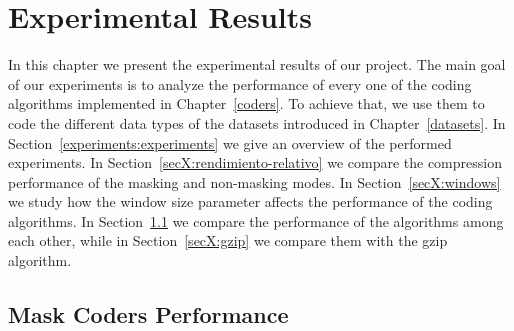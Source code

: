 
\chapter{Experimental Results} %

\label{experiments} %


\newcommand{\maskalgo}{\textit{M}}
\newcommand{\NOmaskalgo}{\textit{NM}}
\newcommand{\coder}{\textit{c}}
\newcommand{\difrelativa}{\textit{RD}}
\newcommand{\tasacompresion}{\textit{CR}}
\newcommand{\nmbits}{\NOmaskalgo_{\textit{S}}}
\newcommand{\mbits}{\maskalgo_\textit{S}}
\newcommand{\cmaskalgo}{$c_\maskalgo$}
\newcommand{\cNOmaskalgo}{$c_\NOmaskalgo$}
\newcommand{\ca}{\textit{CI}}
\newcommand{\algo}{\textit{c}}




In this chapter we present the experimental results of our project. The main goal of our experiments is to analyze the performance of every one of the coding algorithms implemented in Chapter~\ref{coders}. To achieve that, we use them to code the different data types of the datasets introduced in Chapter~\ref{datasets}. In Section~\ref{experiments:experiments} we give an overview of the performed experiments. In Section~\ref{secX:rendimiento-relativo} we compare the compression performance of the masking and non-masking modes. In Section~\ref{secX:windows} we study how the window size parameter affects the performance of the coding algorithms. In Section~\ref{secX:codersmask} we compare the performance of the algorithms among each other, while in Section~\ref{secX:gzip} we compare them with the gzip algorithm.





















\clearpage
\section{Mask Coders Performance}
\label{secX:codersmask}

